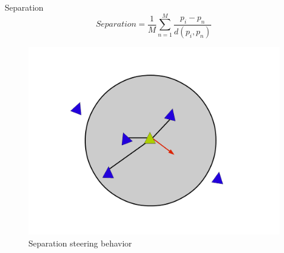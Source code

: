 \documentclass[red]{beamer}
\begin{document}
\begin{frame}{Separation}
	\pause
	\begin{equation}
	\label{separationEquation}
	Separation =\frac{1}{M} \sum_{n=1}^{M} \frac{p_i - p_n}{d(p_i,p_n)}
	\end{equation}
	
	\pause
	\begin{figure}[htbp]
	\begin{center}
	\includegraphics[scale=0.15]{../figures/separation.pdf}
	\caption{Separation steering behavior}
	\label{separation}
	\end{center}
	\end{figure}
\end{frame}
\end{document}
